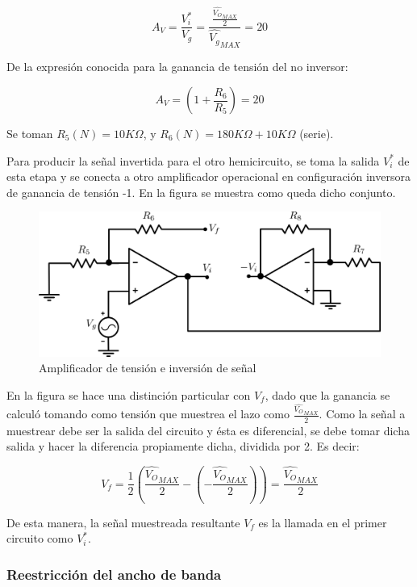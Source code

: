 \[
A_V = \frac{V_i^*}{V_g} = \frac{ \frac{\hat{V_O}_{MAX}}{2} }{\hat{V_g}_{MAX}} = 20
\]

De la expresión conocida para la ganancia de tensión del no inversor:

\[
A_V = \left( 1 + \frac{R_6}{R_5} \right) = 20
\]

Se toman $R_5(N) = 10K\Omega$, y $R_6(N) = 180K\Omega + 10K\Omega$ (serie).

Para producir la señal invertida para el otro hemicircuito, se toma la salida $V_i^*$ de esta etapa y se conecta a otro amplificador operacional en configuración inversora de ganancia de tensión -1. En la figura se muestra como queda dicho conjunto.

\begin{figure}[!ht]
\begin{centering}
\includegraphics[scale=0.5]{Imagenes/opamp2SinCap.png}
\par\end{centering}
\caption{Amplificador de tensión e inversión de señal}
\end{figure}

En la figura se hace una distinción particular con $V_f$, dado que la ganancia se calculó tomando como tensión que muestrea el lazo como $\frac{\hat{V_O}_{MAX}}{2}$. Como la señal a muestrear debe ser la salida del circuito y ésta es diferencial, se debe tomar dicha salida y hacer la diferencia propiamente dicha, dividida por 2. Es decir:

\[
V_f = \frac{1}{2}\left( \frac{\hat{V_O}_{MAX}}{2} - \left( -\frac{\hat{V_O}_{MAX}}{2} \right) \right) = \frac{\hat{V_O}_{MAX}}{2}
\]

De esta manera, la señal muestreada resultante $V_f$ es la llamada en el primer circuito como $V_i^*$.

\subsubsection{Reestricción del ancho de banda}



